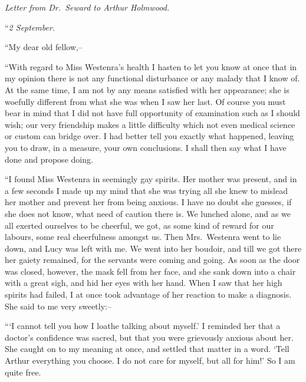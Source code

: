 \documentclass[12pt,openright]{book}
\begin{document}
\textit{Letter from Dr. Seward to Arthur Holmwood.}

“\textit{2 September.}

“My dear old fellow,–

“With regard to Miss Westenra’s health I hasten to let you know at once that in my opinion there is not any functional disturbance or any malady that I know of. At the same time, I am not by any means satisfied with her appearance; she is woefully different from what she was when I saw her last. Of course you must bear in mind that I did not have full opportunity of examination such as I should wish; our very friendship makes a little difficulty which not even medical science or custom can bridge over. I had better tell you exactly what happened, leaving you to draw, in a measure, your own conclusions. I shall then say what I have done and propose doing.

“I found Miss Westenra in seemingly gay spirits. Her mother was present, and in a few seconds I made up my mind that she was trying all she knew to mislead her mother and prevent her from being anxious. I have no doubt she guesses, if she does not know, what need of caution there is. We lunched alone, and as we all exerted ourselves to be cheerful, we got, as some kind of reward for our labours, some real cheerfulness amongst us. Then Mrs. Westenra went to lie down, and Lucy was left with me. We went into her boudoir, and till we got there her gaiety remained, for the servants were coming and going. As soon as the door was closed, however, the mask fell from her face, and she sank down into a chair with a great sigh, and hid her eyes with her hand. When I saw that her high spirits had failed, I at once took advantage of her reaction to make a diagnosis. She said to me very sweetly:–

“‘I cannot tell you how I loathe talking about myself.’ I reminded her that a doctor’s confidence was sacred, but that you were grievously anxious about her. She caught on to my meaning at once, and settled that matter in a word. ‘Tell Arthur everything you choose. I do not care for myself, but all for him!’ So I am quite free.
\end{document}
